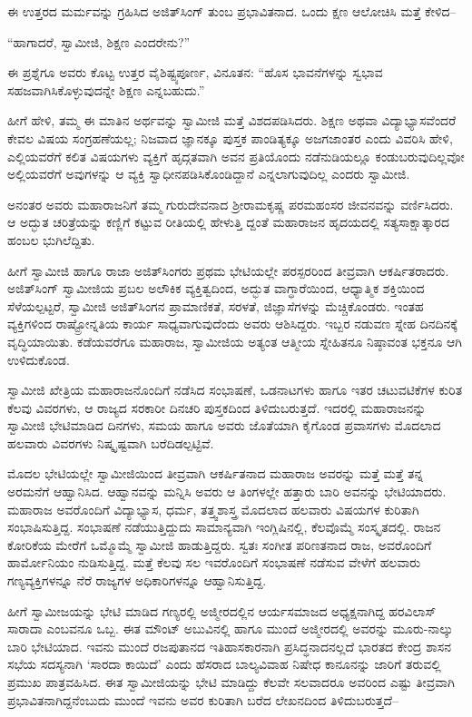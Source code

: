 ಈ ಉತ್ತರದ ಮರ್ಮವನ್ನು ಗ್ರಹಿಸಿದ ಅಜಿತ್​ಸಿಂಗ್ ತುಂಬ ಪ್ರಭಾವಿತನಾದ. ಒಂದು ಕ್ಷಣ ಆಲೋಚಿಸಿ ಮತ್ತೆ ಕೇಳಿದ–

“ಹಾಗಾದರೆ, ಸ್ವಾಮೀಜಿ, ಶಿಕ್ಷಣ ಎಂದರೇನು?”

ಈ ಪ್ರಶ್ನೆಗೂ ಅವರು ಕೊಟ್ಟ ಉತ್ತರ ವೈಶಿಷ್ಟ್ಯಪೂರ್ಣ, ವಿನೂತನ: “ಹೊಸ ಭಾವನೆಗಳನ್ನು ಸ್ವಭಾವ ಸಹಜವಾಗಿಸಿಕೊಳ್ಳುವುದನ್ನೇ ಶಿಕ್ಷಣ ಎನ್ನಬಹುದು.”

ಹೀಗೆ ಹೇಳಿ, ತಮ್ಮ ಈ ಮಾತಿನ ಅರ್ಥವನ್ನು ಸ್ವಾಮೀಜಿ ಮತ್ತೆ ವಿಶದಪಡಿಸಿದರು. ಶಿಕ್ಷಣ ಅಥವಾ ವಿದ್ಯಾಭ್ಯಾಸವೆಂದರೆ ಕೇವಲ ವಿಷಯ ಸಂಗ್ರಹಣೆಯಲ್ಲ; ನಿಜವಾದ ಜ್ಞಾನಕ್ಕೂ ಪುಸ್ತಕ ಪಾಂಡಿತ್ಯಕ್ಕೂ ಅಜಗಜಾಂತರ ಎಂದು ವಿವರಿಸಿ ಹೇಳಿ, ಎಲ್ಲಿಯವರೆಗೆ ಕಲಿತ ವಿಷಯಗಳು ವ್ಯಕ್ತಿಗೆ ಹೃದ್ಗತವಾಗಿ ಅವನ ಪ್ರತಿಯೊಂದು ನಡೆನುಡಿಯಲ್ಲೂ ಕಂಡುಬರುವುದಿಲ್ಲವೋ ಅಲ್ಲಿಯವರೆಗೆ ಅವುಗಳನ್ನು ಆ ವ್ಯಕ್ತಿ ಸ್ವಾಧೀನಪಡಿಸಿಕೊಂಡಿದ್ದಾನೆ ಎನ್ನಲಾಗುವುದಿಲ್ಲ ಎಂದರು ಸ್ವಾಮೀಜಿ.

ಅನಂತರ ಅವರು ಮಹಾರಾಜನಿಗೆ ತಮ್ಮ ಗುರುದೇವನಾದ ಶ್ರೀರಾಮಕೃಷ್ಣ ಪರಮಹಂಸರ ಜೀವನವನ್ನು ವರ್ಣಿಸಿದರು. ಆ ಅದ್ಭುತ ಚರಿತ್ರೆಯನ್ನು ಕಣ್ಣಿಗೆ ಕಟ್ಟುವ ರೀತಿಯಲ್ಲಿ ಹೇಳುತ್ತಿ ದ್ದಂತೆ ಮಹಾರಾಜನ ಹೃದಯದಲ್ಲಿ ಸತ್ಯಸಾಕ್ಷಾತ್ಕಾರದ ಹಂಬಲ ಭುಗಿಲೆದ್ದಿತು.

ಹೀಗೆ ಸ್ವಾಮೀಜಿ ಹಾಗೂ ರಾಜಾ ಅಜಿತ್​ಸಿಂಗರು ಪ್ರಥಮ ಭೇಟಿಯಲ್ಲೇ ಪರಸ್ಪರರಿಂದ ತೀವ್ರವಾಗಿ ಆಕರ್ಷಿತರಾದರು. ಅಜಿತ್​ಸಿಂಗ್ ಸ್ವಾಮೀಜಿಯ ಪ್ರಬಲ ಅಲೌಕಿಕ ವ್ಯಕ್ತಿತ್ವದಿಂದ, ಅದ್ಭುತ ವಾಗ್ಧಾರೆಯಿಂದ, ಆಧ್ಯಾತ್ಮಿಕ ಶಕ್ತಿಯಿಂದ ಸೆಳೆಯಲ್ಪಟ್ಟರೆ, ಸ್ವಾಮೀಜಿ ಅಜಿತ್​ಸಿಂಗನ ಪ್ರಾಮಾಣಿಕತೆ, ಸರಳತೆ, ಜಿಜ್ಞಾಸೆಗಳನ್ನು ಮೆಚ್ಚಿಕೊಂಡರು. ಇಂತಹ ವ್ಯಕ್ತಿಗಳಿಂದ ರಾಷ್ಟ್ರೋನ್ನತಿಯ ಕಾರ್ಯ ಸಾಧ್ಯವಾಗುವುದೆಂದು ಅವರು ಆಶಿಸಿದ್ದರು. ಇಬ್ಬರ ನಡುವಣ ಸ್ನೇಹ ದಿನದಿನಕ್ಕೆ ವೃದ್ಧಿಯಾಯಿತು. ಕಡೆಯವರೆಗೂ ಮಹಾರಾಜ, ಸ್ವಾಮೀಜಿಯ ಅತ್ಯಂತ ಆತ್ಮೀಯ ಸ್ನೇಹಿತನೂ ನಿಷ್ಠಾವಂತ ಭಕ್ತನೂ ಆಗಿ ಉಳಿದುಕೊಂಡ.

ಸ್ವಾಮೀಜಿ ಖೇತ್ರಿಯ ಮಹಾರಾಜನೊಂದಿಗೆ ನಡೆಸಿದ ಸಂಭಾಷಣೆ, ಒಡನಾಟಗಳು ಹಾಗೂ ಇತರ ಚಟುವಟಿಕೆಗಳ ಕುರಿತ ಕೆಲವು ವಿವರಗಳು, ಆ ರಾಜ್ಯದ ಸರಕಾರೀ ದಿನಚರಿ ಪುಸ್ತಕದಿಂದ ತಿಳಿದುಬರುತ್ತದೆ. ಇದರಲ್ಲಿ ಮಹಾರಾಜನನ್ನು ಸ್ವಾಮೀಜಿ ಭೇಟಿಮಾಡಿದ ದಿನಗಳು, ಸಮಯ ಹಾಗೂ ಅವರು ಜೊತೆಯಾಗಿ ಕೈಗೊಂಡ ಪ್ರವಾಸಗಳು ಮೊದಲಾದ ಹಲವಾರು ವಿವರಗಳು ನಿಷ್ಕೃಷ್ಟವಾಗಿ ಬರೆದಿಡಲ್ಪಟ್ಟಿವೆ.

ಮೊದಲ ಭೇಟಿಯಲ್ಲೇ ಸ್ವಾಮೀಜಿಯಿಂದ ತೀವ್ರವಾಗಿ ಆಕರ್ಷಿತನಾದ ಮಹಾರಾಜ ಅವರನ್ನು ಮತ್ತೆ ಮತ್ತೆ ತನ್ನ ಅರಮನೆಗೆ ಆಹ್ವಾನಿಸಿದ. ಆಹ್ವಾನವನ್ನು ಮನ್ನಿಸಿ ಅವರು ಆ ತಿಂಗಳಲ್ಲೇ ಹತ್ತಾರು ಬಾರಿ ಅವನನ್ನು ಭೇಟಿಯಾದರು. ಮಹಾರಾಜ ಅವರೊಂದಿಗೆ ವಿದ್ಯಾಭ್ಯಾಸ, ಧರ್ಮ, ತತ್ತ್ವಶಾಸ್ತ್ರ ಮೊದಲಾದ ಹಲವಾರು ವಿಷಯಗಳ ಕುರಿತಾಗಿ ಸಂಭಾಷಿಸುತ್ತಿದ್ದ. ಸಂಭಾಷಣೆ ನಡೆಯುತ್ತಿದ್ದುದು ಸಾಮಾನ್ಯವಾಗಿ ಇಂಗ್ಲಿಷಿನಲ್ಲಿ, ಕೆಲವೊಮ್ಮೆ ಸಂಸ್ಕೃತದಲ್ಲಿ. ರಾಜನ ಕೋರಿಕೆಯ ಮೇರೆಗೆ ಒಮ್ಮೊಮ್ಮೆ ಸ್ವಾಮೀಜಿ ಹಾಡುತ್ತಿದ್ದರು. ಸ್ವತಃ ಸಂಗೀತ ಪರಿಣತನಾದ ರಾಜ, ಅವರೊಂದಿಗೆ ಹಾರ್ಮೋನಿಯಂ ನುಡಿಸುತ್ತಿದ್ದ. ಮತ್ತೆ ಕೆಲವು ಸಲ ಇವರೊಂದಿಗೆ ಸಂಭಾಷಣೆ ನಡೆಸುವ ವೇಳೆಗೆ ಹಲವಾರು ಗಣ್ಯವ್ಯಕ್ತಿಗಳನ್ನೂ ನೆರೆ ರಾಜ್ಯಗಳ ಅಧಿಕಾರಿಗಳನ್ನೂ ಆಹ್ವಾನಿಸುತ್ತಿದ್ದ.

ಹೀಗೆ ಸ್ವಾಮೀಜಯನ್ನು ಭೇಟಿ ಮಾಡಿದ ಗಣ್ಯರಲ್ಲಿ ಅಜ್ಮೀರದಲ್ಲಿನ ಆರ್ಯಸಮಾಜದ ಅಧ್ಯಕ್ಷನಾಗಿದ್ದ ಹರವಿಲಾಸ್ ಸಾರಾದಾ ಎಂಬವನೂ ಒಬ್ಬ. ಈತ ಮೌಂಟ್ ಅಬುವಿನಲ್ಲಿ ಹಾಗೂ ಮುಂದೆ ಅಜ್ಮೀರದಲ್ಲಿ ಅವರನ್ನು ಮೂರು-ನಾಲ್ಕು ಬಾರಿ ಭೇಟಿಯಾದ. ಇವನು ಮುಂದೆ ರಜಪುತಾನದ ಇತಿಹಾಸಕಾರನಾಗಿ ಪ್ರಸಿದ್ಧನಾದನಲ್ಲದೆ ಭಾರತದ ಕೇಂದ್ರ ಶಾಸನ ಸಭೆಯ ಸದಸ್ಯನಾಗಿ ‘ಸಾರದಾ ಕಾಯಿದೆ’ ಎಂದು ಹೆಸರಾದ ಬಾಲ್ಯವಿವಾಹ ನಿಷೇಧ ಕಾನೂನನ್ನು ಜಾರಿಗೆ ತರುವಲ್ಲಿ ಪ್ರಮುಖ ಪಾತ್ರವಹಿಸಿದ. ಈತ ಸ್ವಾಮೀಜಿಯನ್ನು ಭೇಟಿ ಮಾಡಿದ್ದು ಕೆಲವೇ ಸಲವಾದರೂ ಅವರಿಂದ ಎಷ್ಟು ತೀವ್ರವಾಗಿ ಪ್ರಭಾವಿತನಾಗಿದ್ದನೆಂಬುದು ಮುಂದೆ ಇವನು ಅವರ ಕುರಿತಾಗಿ ಬರೆದ ಲೇಖನದಿಂದ ತಿಳಿದುಬರುತ್ತದೆ–

